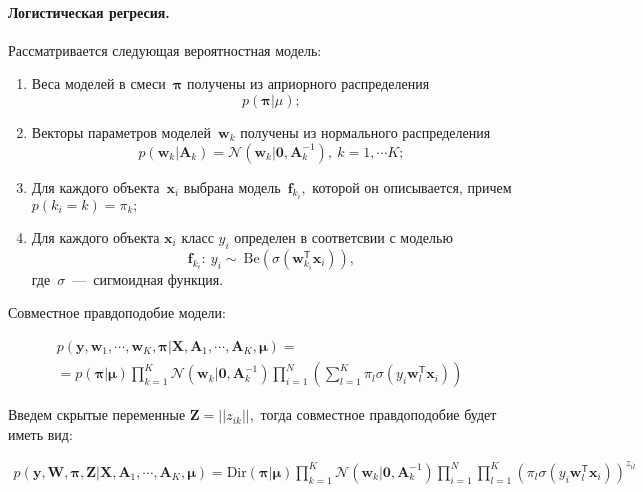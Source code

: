 \documentclass[12pt, twoside]{article}
\numberwithin{equation}{section}
\begin{document}
\paragraph{Логистическая регресия.} Рассматривается следующая вероятностная модель:

\begin{enumerate}
	\item Веса моделей в смеси~$\bm{\pi}$ получены из априорного распределения 
	$$p\left(\bm{\pi}|\mu\right);$$
	
	\item Векторы параметров моделей~$\textbf{w}_k$ получены из нормального распределения 
	$$p\left(\textbf{w}_k|\textbf{A}_k\right) = \mathcal{N}\left(\textbf{w}_k|\textbf{0}, \textbf{A}_{k}^{-1}\right),~k=1,\cdots K;$$
	
	\item Для каждого объекта~$\textbf{x}_i$ выбрана модель~$\textbf{f}_{k_i},$ которой он описывается, причем $p\left(k_i=k\right) = \pi_k;$
	
	\item  Для каждого объекта $\textbf{x}_i$ класс $y_i$ определен в соответсвии с моделью 
	$$\textbf{f}_{k_i}:~y_i\sim~\text{Be}\left(\sigma\left(\textbf{w}_{k_i}^{\mathsf{T}}\textbf{x}_i\right)\right),$$
	 где~$\sigma$~---~сигмоидная функция.
\end{enumerate}

Совместное правдоподобие модели:

\begin{equation}
\label{eq:st:3}
\begin{aligned}
p\left(\textbf{y}, \textbf{w}_1,\cdots,\textbf{w}_K, \bm{\pi}|\textbf{X}, \textbf{A}_1, \cdots, \textbf{A}_K, \bm{\mu}\right) = \\
=
p\left(\bm{\pi}|\bm{\mu}\right)\prod_{k=1}^{K}\mathcal{N}\left(\textbf{w}_k|\textbf{0}, \textbf{A}_{k}^{-1}\right)\prod_{i=1}^{N}\left(\sum_{l=1}^{K}\pi_l\sigma\left(y_i\textbf{w}_{l}^{\mathsf{T}}\textbf{x}_{i}\right)\right)
\end{aligned}
\end{equation}

Введем скрытые переменные $\textbf{Z} = ||z_{ik}||,$ тогда совместное правдоподобие будет иметь вид:

\begin{equation}
\label{eq:st:4}
\begin{aligned}
p\left(\textbf{y}, \textbf{W}, \bm{\pi}, \textbf{Z}|\textbf{X}, \textbf{A}_1, \cdots, \textbf{A}_K, \bm{\mu}\right)
=
\text{Dir}\left(\bm{\pi}|\bm{\mu}\right)\prod_{k=1}^{K}\mathcal{N}\left(\textbf{w}_k|\textbf{0}, \textbf{A}_{k}^{-1}\right)\prod_{i=1}^{N}\prod_{l=1}^{K}\left(\pi_l\sigma\left(y_i\textbf{w}_{l}^{\mathsf{T}}\textbf{x}_{i}\right)\right)^{z_{il}}
\end{aligned}
\end{equation}
\end{document}
